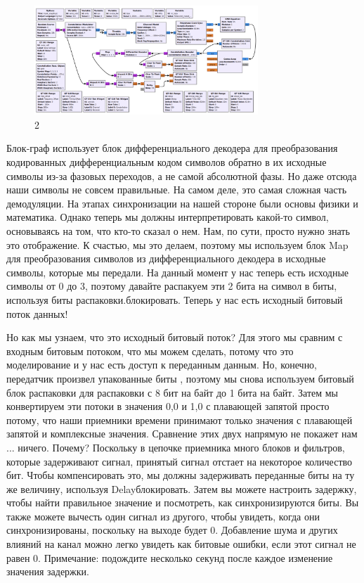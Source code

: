 \documentclass[10pt,a4paper,oneside]{article}
\begin{document}
\begin{figure}[H]
        \centering
        \includegraphics[width=0.75\textwidth]{pics/23.png}
        \caption{2}
        \label{fig:first}
\end{figure}

Блок-граф использует блок дифференциального декодера для преобразования кодированных дифференциальным кодом символов обратно в их исходные символы из-за фазовых переходов, а не самой абсолютной фазы. Но даже отсюда наши символы не совсем правильные. На самом деле, это самая сложная часть демодуляции. На этапах синхронизации на нашей стороне были основы физики и математика. Однако теперь мы должны интерпретировать какой-то символ, основываясь на том, что кто-то сказал о нем. Нам, по сути, просто нужно знать это отображение. К счастью, мы это делаем, поэтому мы используем блок Map для преобразования символов из дифференциального декодера в исходные символы, которые мы передали. На данный момент у нас теперь есть исходные символы от 0 до 3, поэтому давайте распакуем эти 2 бита на символ в биты, используя биты распаковки.блокировать. Теперь у нас есть исходный битовый поток данных!

Но как мы узнаем, что это исходный битовый поток? Для этого мы сравним с входным битовым потоком, что мы можем сделать, потому что это моделирование и у нас есть доступ к переданным данным. Но, конечно, передатчик произвел упакованные биты , поэтому мы снова используем битовый блок распаковки для распаковки с 8 бит на байт до 1 бита на байт. Затем мы конвертируем эти потоки в значения 0,0 и 1,0 с плавающей запятой просто потому, что наши приемники времени принимают только значения с плавающей запятой и комплексные значения. Сравнение этих двух напрямую не покажет нам ... ничего. Почему? Поскольку в цепочке приемника много блоков и фильтров, которые задерживают сигнал, принятый сигнал отстает на некоторое количество бит. Чтобы компенсировать это, мы должны задерживать переданные биты на ту же величину, используя Delayблокировать. Затем вы можете настроить задержку, чтобы найти правильное значение и посмотреть, как синхронизируются биты. Вы также можете вычесть один сигнал из другого, чтобы увидеть, когда они синхронизированы, поскольку на выходе будет 0. Добавление шума и других влияний на канал можно легко увидеть как битовые ошибки, если этот сигнал не равен 0. Примечание: подождите несколько секунд после каждое изменение значения задержки.
\end{document}
